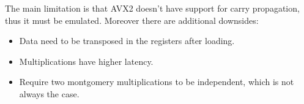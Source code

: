The main limitation is that AVX2 doesn't have support for carry propagation, thus it must be emulated. Moreover there are additional downsides:
\begin{itemize}
\item Data need to be transposed in the registers after loading.
\item Multiplications have higher latency.
\item Require two montgomery multiplications to be independent, which is not always the case.
\end{itemize}
